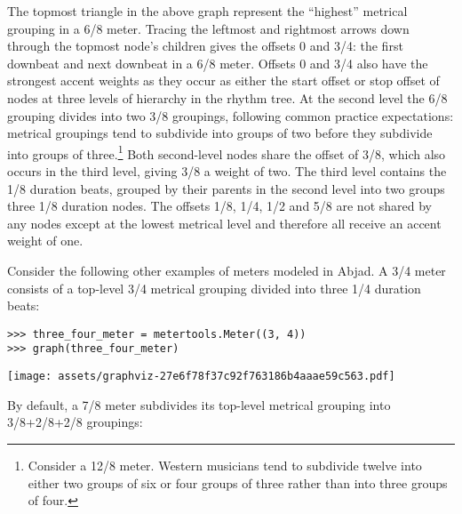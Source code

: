 The topmost triangle in the above graph represent the \enquote{highest}
metrical grouping in a 6/8 meter. Tracing the leftmost and rightmost arrows
down through the topmost node's children gives the offsets 0 and 3/4: the first
downbeat and next downbeat in a 6/8 meter. Offsets 0 and 3/4 also have the
strongest accent weights as they occur as either the start offset or stop
offset of nodes at three levels of hierarchy in the rhythm tree. At the second
level the 6/8 grouping divides into two 3/8 groupings, following common
practice expectations: metrical groupings tend to subdivide into groups of two
before they subdivide into groups of three.\footnote{Consider a 12/8 meter.
Western musicians tend to subdivide twelve into either two groups of six or
four groups of three rather than into three groups of four.} Both second-level
nodes share the offset of 3/8, which also occurs in the third level, giving 3/8
a weight of two. The third level contains the 1/8 duration beats, grouped by
their parents in the second level into two groups three 1/8 duration nodes. The
offsets 1/8, 1/4, 1/2 and 5/8 are not shared by any nodes except at the lowest
metrical level and therefore all receive an accent weight of one.

Consider the following other examples of meters modeled in Abjad. A 3/4 meter
consists of a top-level 3/4 metrical grouping divided into three 1/4 duration
beats:

\begin{comment}
<abjad>
three_four_meter = metertools.Meter((3, 4))
graph(three_four_meter)
</abjad>
\end{comment}

\begin{singlespacing}
\vspace{-0.5\baselineskip}
\begin{lstlisting}
>>> three_four_meter = metertools.Meter((3, 4))
>>> graph(three_four_meter)
\end{lstlisting}
\noindent\texttt{[image: assets/graphviz-27e6f78f37c92f763186b4aaae59c563.pdf]}
\end{singlespacing}

\noindent By default, a 7/8 meter subdivides its top-level metrical grouping
into 3/8+2/8+2/8 groupings:

\begin{comment}
<abjad>
seven_eight_meter = metertools.Meter((7, 8))
graph(seven_eight_meter)
</abjad>
\end{comment}

